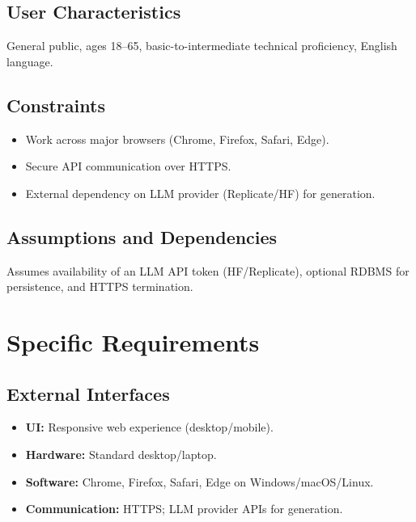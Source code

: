 \documentclass[11pt]{article}
\begin{document}
\subsection{User Characteristics}
General public, ages 18--65, basic-to-intermediate technical proficiency, English language.

\subsection{Constraints}
\begin{itemize}
  \item Work across major browsers (Chrome, Firefox, Safari, Edge).
  \item Secure API communication over HTTPS.
  \item External dependency on LLM provider (Replicate/HF) for generation.
\end{itemize}

\subsection{Assumptions and Dependencies}
Assumes availability of an LLM API token (HF/Replicate), optional RDBMS for persistence, and HTTPS termination.

\section{Specific Requirements}
\subsection{External Interfaces}
\begin{itemize}
  \item \textbf{UI:} Responsive web experience (desktop/mobile).
  \item \textbf{Hardware:} Standard desktop/laptop.
  \item \textbf{Software:} Chrome, Firefox, Safari, Edge on Windows/macOS/Linux.
  \item \textbf{Communication:} HTTPS; LLM provider APIs for generation.
\end{itemize}
\end{document}
